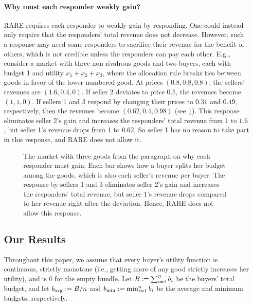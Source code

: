 \paragraph{Why must each responder weakly gain?}
RARE requires each responder to weakly gain by responding.
One could instead only require that the responders' total revenue does not decrease.
However, such a response may need some responders to sacrifice their revenue for the benefit of others,
which is not credible unless the responders can pay each other.
E.g., consider a market with three non-rivalrous goods and two buyers,
each with budget 1 and utility $x_1 + x_2 + x_3$,
where the allocation rule breaks ties between goods in favor of the lower-numbered good.
At prices $(0.8, 0.8, 0.8)$, the sellers' revenues are $(1.6, 0.4, 0)$.
If seller 2 deviates to price $0.5$, the revenues become $(1, 1, 0)$.
If sellers 1 and 3 respond by changing their prices to $0.31$ and $0.49$, respectively,
then the revenues become $(0.62, 0.4, 0.98)$ (see \cref{fig:ir-payments}).
This response eliminates seller 2's gain and increases the responders' total revenue from 1 to $1.6$,
but seller 1's revenue drops from 1 to $0.62$.
So seller 1 has no reason to take part in this response, and RARE does not allow it.


\begin{figure}[t]
\centering

\caption{The market with three goods from the paragraph on why each responder must gain.
Each bar shows how a buyer splits her budget among the goods,
which is also each seller's revenue per buyer.
The response by sellers 1 and 3 eliminates seller 2's gain
and increases the responders' total revenue,
but seller 1's revenue drops compared to her revenue right after the deviation.
Hence, RARE does not allow this response.}
\label{fig:ir-payments}
\end{figure}

\subsection{Our Results}
\label{sec:intro:results}

Throughout this paper, we assume that every buyer's utility function is continuous,
strictly monotone (i.e., getting more of any good strictly increases her utility),
and is 0 for the empty bundle.
Let $B := \sum_{i=1}^n b_i$ be the buyers' total budget,
and let $b_{\operatorname{avg}} := B/n$ and $b_{\min} := \min_{i=1}^n b_i$
be the average and minimum budgets, respectively.

